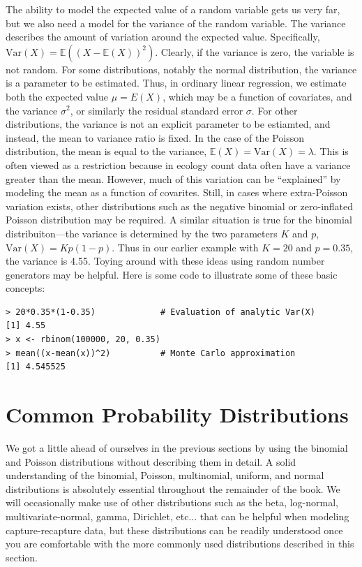 The ability to model the expected value of a random variable gets us
very far, but we also need a model for the variance of the random
variable. The variance %
describes the amount of variation around the expected
value. Specifically, $\text{Var}(X) = \mathbb{E}((X -
\mathbb{E}(X))^2)$. Clearly, if the variance is zero, the variable is
not random.
For some distributions, notably the normal distribution, the variance
is a parameter to be estimated. Thus, in ordinary linear regression,
we estimate both the expected value $\mu=E(X)$,
which may be a function of covariates, and the variance
$\sigma^2$, or similarly the residual standard error $\sigma$. For
other distributions, the variance is not an explicit parameter to be
estiamted, and instead, the mean to variance ratio is fixed. In the
case of the Poisson distribution, the mean is equal to the
variance, $\mathbb{E}(X) = \text{Var}(X) = \lambda$. This is often viewed as a restriction because in ecology
count data often have a variance greater than the mean. However, much
of this variation can be ``explained'' by modeling the mean as a
function of covarites. Still, in cases where extra-Poisson variation
exists, other distributions such as the negative binomial or
zero-inflated Poisson distribution may be required. A similar
situation is true for the binomial distribuiton---the variance is
determined by the two parameters $K$ and $p$, $\text{Var}(X) = Kp(1-p)$. Thus
in our earlier example with $K=20$ and $p=0.35$, the variance is
4.55. Toying around with these ideas using random number generators
may be helpful. Here is some code to illustrate some of these basic concepts:
\begin{verbatim}
> 20*0.35*(1-0.35)             # Evaluation of analytic Var(X)
[1] 4.55
> x <- rbinom(100000, 20, 0.35)
> mean((x-mean(x))^2)          # Monte Carlo approximation
[1] 4.545525
\end{verbatim}



\section{Common Probability Distributions}
\label{sec.modeling.distributions}

We got a little ahead of ourselves in the previous sections by using
the binomial and Poisson distributions without describing them in detail.
A solid understanding of the binomial, Poisson, multinomial, uniform,
and normal distributions is absolutely essential throughout the
remainder of the book. We will occasionally make use of other
distributions such as the beta, log-normal, multivariate-normal,
gamma, Dirichlet, etc... that can be helpful when
modeling capture-recapture data, but these distributions can be
readily understood once you are comfortable with the more commonly
used distributions described in this section.

